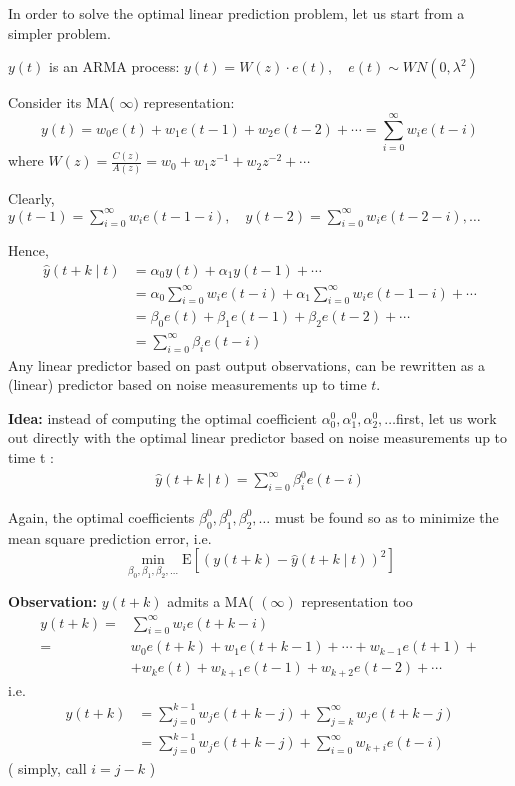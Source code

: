 
In order to solve the optimal linear prediction problem, let us start from a simpler problem.

$y(t)$ is an ARMA process: $y(t)=W(z) \cdot e(t),\quad e(t) \sim W N\left(0, \lambda^{2}\right)$

Consider its MA( $\infty)$ representation:
$$
y(t)=w_{0} e(t)+w_{1} e(t-1)+w_{2} e(t-2)+\cdots=\sum_{i=0}^{\infty} w_{i} e(t-i)
$$
where $W(z)=\frac{C(z)}{A(z)}=w_{0}+w_{1} z^{-1}+w_{2} z^{-2}+\cdots$

Clearly, $ y(t-1)=\sum_{i=0}^{\infty} w_{i} e(t-1-i), \quad y(t-2)=\sum_{i=0}^{\infty} w_{i} e(t-2-i),\ldots$

Hence,
\begin{align*}
	\hat{y}(t+k \mid t) &=\alpha_{0} y(t)+\alpha_{1} y(t-1)+\cdots \\
	&=\alpha_{0} \sum_{i=0}^{\infty} w_{i} e(t-i)+\alpha_{1} \sum_{i=0}^{\infty} w_{i} e(t-1-i)+\cdots \\
	&=\beta_{0} e(t)+\beta_{1} e(t-1)+\beta_{2} e(t-2)+\cdots\\
	&=\sum_{i=0}^{\infty} \beta_{i} e(t-i)
\end{align*}
Any linear predictor based on past output observations, can be rewritten as a (linear) predictor based on noise measurements up to time $t$.

\textbf{Idea:} instead of computing the optimal coefficient $\alpha_{0}^{0},\alpha_{1}^{0},\alpha_{2}^{0},\ldots $first, 
let us work out directly with the optimal linear predictor based on 
noise measurements up to time t :
\begin{align*}
	\hat{y}(t+k \mid t) = \sum_{i=0}^{\infty} \beta_{i}^0 e(t-i)
\end{align*}

Again, the optimal coefficients $\beta_{0}^{0}, \beta_{1}^{0}, \beta_{2}^{0}, \ldots$ must be found so as to minimize the mean square prediction error, i.e.
$$
\min _{\beta_{0}, \beta_{1}, \beta_{2}, \ldots} \mathrm{E}\left[(y(t+k)-\hat{y}(t+k \mid t))^{2}\right]
$$

\textbf{Observation:} $y(t+k)$ admits a MA( $(\infty)$ representation too
\begin{align*}
	y(t+k)=& \sum_{i=0}^{\infty} w_{i} e(t+k-i) \\
	=& w_{0} e(t+k)+w_{1} e(t+k-1)+\cdots+w_{k-1} e(t+1)+\\
	&+w_{k} e(t)+w_{k+1} e(t-1)+w_{k+2} e(t-2)+\cdots
\end{align*}
i.e.
\begin{align*}
	y(t+k) &=\sum_{j=0}^{k-1} w_{j} e(t+k-j)+\sum_{j=k}^{\infty} w_{j} e(t+k-j) \\
	&=\sum_{j=0}^{k-1} w_{j} e(t+k-j)+\sum_{i=0}^{\infty} w_{k+i} e(t-i)
\end{align*}
( simply, call $i=j-k$ )


